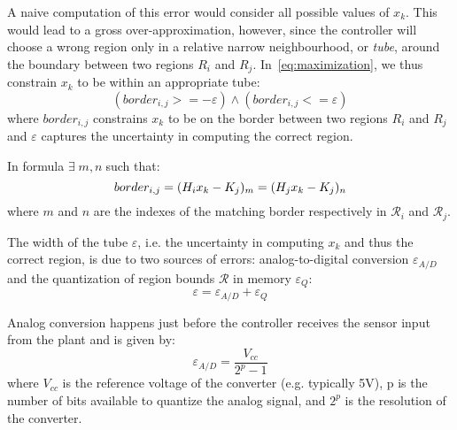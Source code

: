 
A naive computation of this error would consider all possible values of $x_k$.
This would lead to a gross over-approximation, however, since the controller
will choose a wrong region only in a relative narrow neighbourhood, or
\emph{tube}, around the boundary between two regions $R_i$ and $R_j$.
In~\autoref{eq:maximization}, we thus constrain $x_k$ to be within an appropriate tube:
\begin{equation}\label{eq:tube}
(border_{i,j} >= -\varepsilon) \land (border_{i,j} <= \varepsilon)
\end{equation}
where $border_{i,j}$ constrains $x_k$ to be on the border between two regions
$R_i$ and $R_j$ and $\varepsilon$ captures the uncertainty in computing the
correct region.

In formula $\exists\; m,n \;$such that:
\begin{equation}
border_{i,j}=(H_{i}x_{k}-K_{j})_{m} = (H_{j}x_{k}-K_{j})_{n}
\end{equation}
where $m$ and $n$ are the indexes of the matching border respectively in $\mathcal{R}_{i}$ and $\mathcal{R}_{j}$.

The width of the tube $\varepsilon$, i.e. the uncertainty in computing $x_k$ and
thus the correct region, is due to two sources of errors: analog-to-digital
conversion $\varepsilon_{A/D}$ and the quantization of region bounds
$\mathcal{R}$ in memory $\varepsilon_{Q}$:
\begin{equation}\label{eq:epsilontot}
  \varepsilon=\varepsilon_{A/D}+\varepsilon_{Q}
\end{equation}

Analog conversion happens just before the controller receives the sensor input from the plant
and is given by:
\begin{equation*}
\varepsilon_{A/D}=\frac{V_{cc}}{2^{p}-1}
\end{equation*}
where $V_{cc}$ is the reference voltage of the converter (e.g. typically 5V), p is the number of bits available to quantize the analog signal, and $2^{p}$ is the resolution of the converter.



